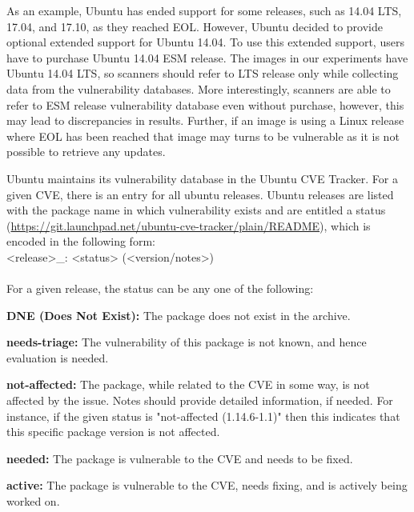 \documentclass[a4paper,num-refs]{oup-contemporary}
\begin{document}
As an example, Ubuntu has ended support for some releases, such as 14.04 LTS,
17.04, and 17.10, as they reached EOL. However, Ubuntu decided to provide optional extended support for Ubuntu 14.04.
To use this extended support, users have to purchase Ubuntu 14.04 ESM release.
The images in our experiments have Ubuntu 14.04 LTS, so scanners should refer
to LTS release only while collecting data from the vulnerability databases.
More interestingly, scanners are able to refer to ESM release vulnerability database
even without purchase, however, this may lead to discrepancies in results.
Further, if an image is using a Linux release where EOL has been reached that image may
turns to be vulnerable as it is not possible to retrieve any updates.

Ubuntu maintains its vulnerability database in the Ubuntu CVE Tracker. For a given CVE, there is an entry for all ubuntu releases.
Ubuntu releases are listed with the package name
in which vulnerability exists and are entitled a status
(\url{https://git.launchpad.net/ubuntu-cve-tracker/plain/README}), which is
encoded in the following form:
\newline \\
\noindent <release>\_<source-package>: <status> (<version/notes>) \\
\newline\\
For a given release, the status can be any one of the following:

\textbf{DNE (Does Not Exist):} The package does not exist in the
		archive.

\textbf{needs-triage:} The vulnerability of this package
		is not known, and hence evaluation is needed.

\textbf{not-affected:} The package, while related to the
		CVE in some way, is not affected by the issue. Notes should
		provide detailed information, if needed. For instance, if the given
		status is "not-affected (1.14.6-1.1)" then this indicates that this specific
		package version is not affected.

\textbf{needed:} The package is vulnerable to the
		CVE and needs to be fixed.

\textbf{active:} The package is vulnerable to the
		CVE, needs fixing, and is actively being worked on.
\end{document}
